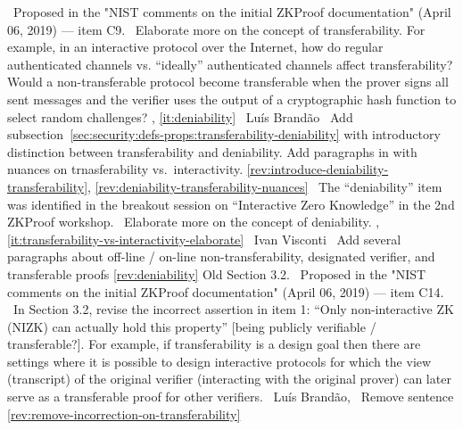 \newcol \ccontext\ Proposed in the "NIST comments on the initial ZKProof documentation" (April 06, 2019) --- item C9.
				\propContrib\ Elaborate more on the concept of transferability. For example, in an interactive protocol over the Internet, how do regular authenticated channels vs. ``ideally'' authenticated channels affect transferability? Would a non-transferable protocol become transferable when the prover signs all sent messages and the verifier uses the output of a cryptographic hash function to select random challenges? 
\newcol {}, \ref{it:deniability}
\newcol \contributors\ Luís Brandão
				\Chan\ Add subsection~\ref{sec:security:defs-props:transferability-deniability} with introductory distinction between transferability and deniability.
				Add paragraphs in  with nuances on trnasferability vs.\ interactivity.				
\newcol \ref{rev:introduce-deniability-transferability}, \ref{rev:deniability-transferability-nuances}
\rowendL
\incItem[it:deniability]
\newcol \ccontext\ The ``deniability'' item was identified in the breakout session on ``Interactive Zero Knowledge'' in the 2nd ZKProof workshop.
				\propContrib\ Elaborate more on the concept of deniability.
\newcol {}, \ref{it:transferability-vs-interactivity-elaborate}
\newcol \contributors\ Ivan Visconti
				\Chan\ Add several paragraphs about off-line / on-line non-transferability, designated verifier, and transferable proofs
\newcol \ref{rev:deniability}
\rowendL
Old Section 3.2.
\newcol \ccontext\ Proposed in the "NIST comments on the initial ZKProof documentation" (April 06, 2019) --- item C14.
				\propContrib\ In Section 3.2, revise the incorrect assertion in item 1: ``Only non-interactive ZK (NIZK) can actually hold this property'' [being publicly verifiable / transferable?]. For example, if transferability is a design goal then there are settings where it is possible to design interactive protocols for which the view (transcript) of the original verifier (interacting with the original prover) can later serve as a transferable proof for other verifiers.
\newcol {}
\newcol \contributors\ Luís Brandão, 
				\Chan\ Remove sentence
\newcol \ref{rev:remove-incorrection-on-transferability}
\rowendL
\myendIssue





